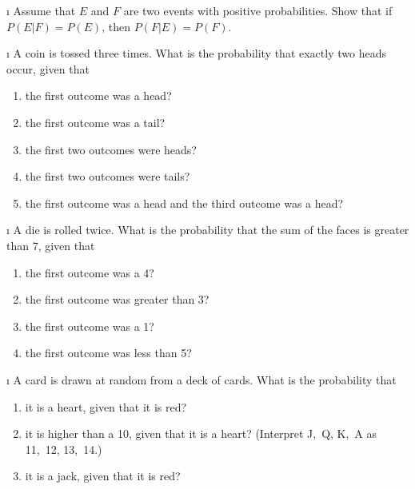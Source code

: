 \exercises
\begin{LJSItem}

\i\label{exer 4.1.1} Assume that $E$ and $F$ are two events with positive
probabilities.  Show that if $P(E|F) = P(E)$, then $P(F|E) = P(F)$.

\i\label{exer 4.1.2} A coin is tossed three times.  What is the probability that exactly two
heads occur, given that
\begin{enumerate}
\item the first outcome was a head?

\item the first outcome was a tail?

\item the first two outcomes were heads?

\item the first two outcomes were tails?

\item the first outcome was a head and the third outcome was a head?
\end{enumerate}

\i\label{exer 4.1.3} A die is rolled twice.  What is the probability that the sum of the faces
is greater than 7, given that
\begin{enumerate}
\item the first outcome was a 4?

\item the first outcome was greater than 3?

\item the first outcome was a 1?

\item the first outcome was less than 5?
\end{enumerate}

\i\label{exer 4.1.4} A card is drawn at random from a deck of cards.  What is the probability
that
\begin{enumerate}
\item it is a heart, given that it is red?

\item it is higher than a 10, given that it is a heart? (Interpret J,~Q, K,~A
as 11,~12, 13,~14.)

\item it is a jack, given that it is red?
\end{enumerate} 


\end{LJSItem}
